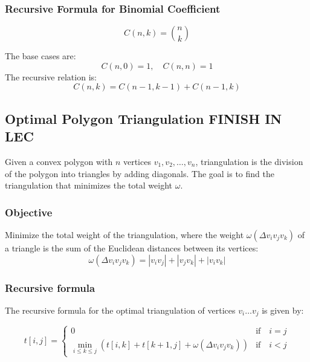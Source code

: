 \subsubsection{Recursive Formula for Binomial Coefficient}
\begin{definition}
    \begin{equation}
        C(n,k) = \binom{n}{k}
    \end{equation}
        
        The base cases are:
        \[
        C(n, 0) = 1, \quad C(n, n) = 1
        \]
        The recursive relation is:
        \[
        C(n, k) = C(n-1, k-1) + C(n-1, k)
        \]
\end{definition}

\subsection{Optimal Polygon Triangulation FINISH IN LEC}

\begin{definition}
    Given a convex polygon with \(n\) vertices \(v_1, v_2, \dots, v_n\), triangulation is the division of the polygon into triangles by adding diagonals. The goal is to find the triangulation that minimizes the total weight \(\omega\).
\end{definition}
    
\subsubsection{Objective}
\begin{definition}
    Minimize the total weight of the triangulation, where the weight \(\omega(\Delta v_i v_j v_k)\) of a triangle is the sum of the Euclidean distances between its vertices:
    \begin{equation}
        \omega(\Delta v_i v_j v_k) = |v_i v_j| + |v_j v_k| + |v_i v_k|
    \end{equation}
\end{definition}    

\subsubsection{Recursive formula}
\begin{definition}
    The recursive formula for the optimal triangulation of vertices \(v_i \dots v_j\) is given by:
    
    \begin{equation}
    t[i, j] = 
    \begin{cases}
    0 & \text{if} \quad i = j \\
    \min_{i \leq k \leq j} \left( t[i, k] + t[k+1, j] + \omega(\Delta v_i v_j v_k) \right) & \text{if} \quad i < j
    \end{cases}
    \end{equation}
\end{definition}

